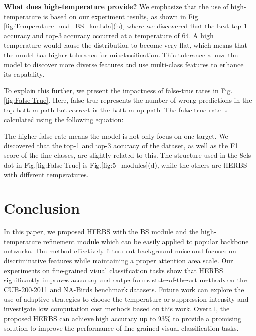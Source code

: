 \documentclass[journal]{IEEEtran}
\begin{document}
\textbf{What does high-temperature provide?} We emphasize that the use of high-temperature is based on our experiment results, as shown in Fig.\ref{fig:Temperature_and_BS_lambda}(b), where we discovered that the best top-1 accuracy and top-3 accuracy occurred at a temperature of 64. A high temperature would cause the distribution to become very flat, which means that the model has higher tolerance for misclassification. This tolerance allows the model to discover more diverse features and use multi-class features to enhance its capability. 

To explain this further, we present the impactness of false-true rates in Fig.\ref{fig:False-True}. Here, false-true represents the number of wrong predictions in the top-bottom path but correct in the bottom-up path. The false-true rate is calculated using the following equation:


The higher false-rate means the model is not only focus on one target. We discovered that the top-1 and top-3 accuracy of the dataset, as well as the F1 score of the fine-classes, are slightly related to this. The structure used in the 8cls dot in Fig.\ref{fig:False-True} is Fig.\ref{fig:5_modules}(d), while the others are HERBS with different temperatures.

\section{Conclusion}
In this paper, we proposed HERBS with the BS module and the high-temperature refinement module which can be easily applied to popular backbone networks. The method effectively filters out background noise and focuses on discriminative features while maintaining a proper attention area scale. Our experiments on fine-grained visual classification tasks show that HERBS significantly improves accuracy and outperforms state-of-the-art methods on the CUB-200-2011 and NA-Birds benchmark datasets. Future work can explore the use of adaptive strategies to choose the temperature or suppression intensity and investigate low computation cost methods based on this work. Overall, the proposed HERBS can achieve high accuracy up to 93\% to provide a promising solution to improve the performance of fine-grained visual classification tasks.

{\small


}
\end{document}
